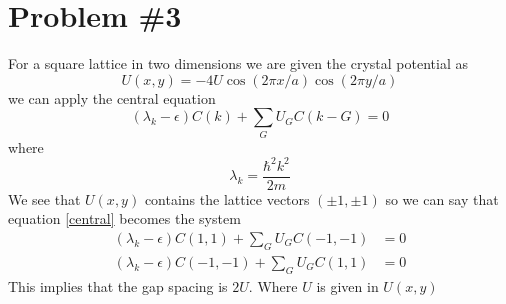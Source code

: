 \documentclass[11pt]{article}
\numberwithin{equation}{section}
\begin{document}
\section{Problem \#3}
For a square lattice in two dimensions we are given the crystal potential as
$$U(x,y) = -4U\cos(2\pi x/a)\cos(2\pi y/a)$$
we can apply the central equation 
\begin{equation}
(\lambda_k - \epsilon)C(k) +\sum_{G}U_GC(k-G) = 0
\label{central}
\end{equation}
where
$$\lambda_k = \frac{\hbar^2k^2}{2m}$$
We see that $U(x,y)$ contains the lattice vectors $(\pm 1,\pm1)$ so we can say that equation \ref{central} becomes the system
\begin{align*}
(\lambda_k - \epsilon)C(1,1) +\sum_{G}U_GC(-1,-1) &= 0\\
(\lambda_k - \epsilon)C(-1,-1) +\sum_{G}U_GC(1,1) &= 0
\end{align*}
This implies that the gap spacing is $2U$. Where $U$ is given in $U(x,y)$
\end{document}
